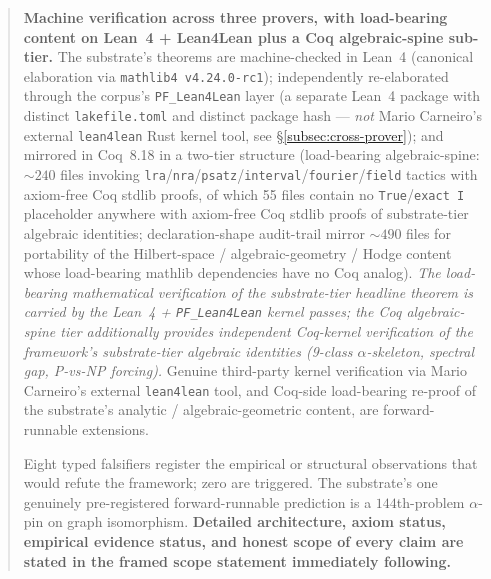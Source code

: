 \documentclass[11pt,a4paper]{amsart}
\theoremstyle{plain}
\theoremstyle{definition}
\begin{document}
\begin{abstract}
\textbf{Machine verification across three provers, with load-bearing content on Lean~4 + Lean4Lean plus a Coq algebraic-spine sub-tier.} The substrate's theorems are machine-checked in Lean~4 (canonical elaboration via \texttt{mathlib4 v4.24.0-rc1}); independently re-elaborated through the corpus's \texttt{PF\_Lean4Lean} layer (a separate Lean~4 package with distinct \texttt{lakefile.toml} and distinct package hash --- \emph{not} Mario Carneiro's external \texttt{lean4lean} Rust kernel tool, see \S\ref{subsec:cross-prover}); and mirrored in Coq~8.18 in a two-tier structure (load-bearing algebraic-spine: $\sim 240$ files invoking \texttt{lra}/\texttt{nra}/\texttt{psatz}/\texttt{interval}/\texttt{fourier}/\texttt{field} tactics with axiom-free Coq stdlib proofs, of which 55 files contain no \texttt{True}/\texttt{exact I} placeholder anywhere with axiom-free Coq stdlib proofs of substrate-tier algebraic identities; declaration-shape audit-trail mirror $\sim 490$ files for portability of the Hilbert-space / algebraic-geometry / Hodge content whose load-bearing mathlib dependencies have no Coq analog). \emph{The load-bearing mathematical verification of the substrate-tier headline theorem is carried by the Lean~4 + \texttt{PF\_Lean4Lean} kernel passes; the Coq algebraic-spine tier additionally provides independent Coq-kernel verification of the framework's substrate-tier algebraic identities (9-class $\alpha$-skeleton, spectral gap, P-vs-NP forcing).} Genuine third-party kernel verification via Mario Carneiro's external \texttt{lean4lean} tool, and Coq-side load-bearing re-proof of the substrate's analytic / algebraic-geometric content, are forward-runnable extensions.

Eight typed falsifiers register the empirical or structural observations that would refute the framework; zero are triggered. The substrate's one genuinely pre-registered forward-runnable prediction is a $144$th-problem $\alpha$-pin on graph isomorphism. \textbf{Detailed architecture, axiom status, empirical evidence status, and honest scope of every claim are stated in the framed scope statement immediately following.}
\end{abstract}

\maketitle

\vspace*{-1em}
\end{document}
